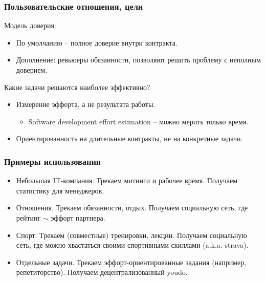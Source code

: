 \documentclass[11pt,handout,pdf,hyperref={unicode}]{beamer}
\begin{document}
\begin{frame}
  \frametitle{Пользовательские отношения, цели}

  Модель доверия:
  \begin{itemize}
  \item По умолчанию -- полное доверие внутри контракта.
  \item Дополнение: ревьюеры обязанности, позволяют решить проблему с
    неполным доверием.
  \end{itemize}

  Какие задачи решаются наиболее эффективно?
  \begin{itemize}
  \item Измерение эффорта, а не результата работы.
    \begin{itemize}
    \item Software development effort estimation -- можно мерить только время.
    \end{itemize}
  \item Ориентированность на длительные контракты, не на конкретные задачи.
  \end{itemize}

\end{frame}

\begin{frame}
  \frametitle{Примеры использования}

  \begin{itemize}
    \item Небольшая IT-компания. Трекаем митинги и рабочее
      время. Получаем статистику для менеджеров.
    \item Отношения. Трекаем обязанности, отдых. Получаем социальную
      сеть, где рейтинг $\sim$ эффорт партнера.
    \item Спорт. Трекаем (совместные) тренировки, лекции. Получаем
      социальную сеть, где можно хвастаться своими спортивными
      скиллами (a.k.a. strava).
    \item Отдельные задачи. Трекаем эффорт-ориентированные задания
      (например, репетиторство). Получаем децентрализованный youdo.
  \end{itemize}
\end{frame}
\end{document}
